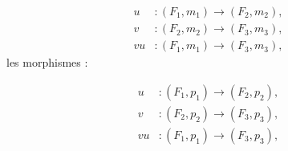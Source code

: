 \begin{equation}
  \begin{aligned}
    u&\colon(F_1,m_1)\longrightarrow(F_2,m_2),\\
    v&\colon(F_2,m_2)\longrightarrow(F_3,m_3),\\
    vu&\colon(F_1,m_1)\longrightarrow(F_3,m_3),
  \end{aligned}
  \tag{1.4.7.1}
\end{equation}
les morphismes :

\begin{equation}
  \begin{aligned}
    u&\colon(F_1,p_1)\longrightarrow(F_2,p_2),\\
    v&\colon(F_2,p_2)\longrightarrow(F_3,p_3),\\
    vu&\colon(F_1,p_1)\longrightarrow(F_3,p_3),
  \end{aligned}
  \tag{1.4.7.2}
\end{equation}

